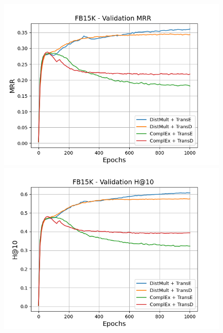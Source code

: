 \begin{figure}[H]
    \centering
    \begin{minipage}{.45\textwidth}
      \centering
      \includegraphics[width=0.9\linewidth]{figures/results/gan_train/not_pretrained/uncertainty/max/entropy/fb15k/1k_epochs/uncertainty_fb15k_mrrs.png}
    \end{minipage}%
    \begin{minipage}{.45\textwidth}
      \centering
      \includegraphics[width=0.9\linewidth]{figures/results/gan_train/not_pretrained/uncertainty/max/entropy/fb15k/1k_epochs/uncertainty_fb15k_hit10.png}
    \end{minipage}
    

\end{figure}
